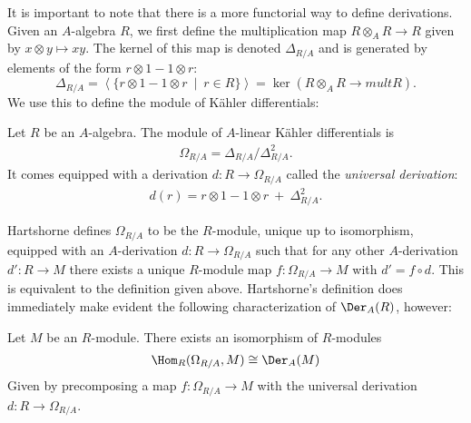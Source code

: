 It is important to note that there is a more functorial way to define derivations. Given an $A$-algebra $R$, we first define the multiplication map $R\otimes_A R\to R$ given by $x\otimes y\mapsto xy$. The kernel of this map is denoted $\Delta_{R/A}$ and is generated by elements of the form $r\otimes 1 - 1\otimes r$:
\begin{equation}\label{eqn:delta-module}
	\Delta_{R/A} = \left\langle \{r\otimes 1 - 1\otimes r ~\mid~ r\in R\} \right\rangle = \ker(R\otimes_A R \to{mult} R).
\end{equation}
We use this to define the module of K\"ahler differentials:
\begin{defn}\label{defn:kahler-diff}
	Let $R$ be an $A$-algebra. The module of $A$-linear K\"ahler differentials is
	\begin{align*}
		\Omega_{R/A} = \Delta_{R/A}/\Delta_{R/A}^2.
	\end{align*}
	It comes equipped with a derivation $d:R\to \Omega_{R/A}$ called the \emph{universal derivation}:
	\begin{align*}
		d(r) = r \otimes 1 - 1\otimes r ~+~ \Delta_{R/A}^2.
	\end{align*}
\end{defn}
Hartshorne defines $\Omega_{R/A}$ to be the $R$-module, unique up to isomorphism, equipped with an $A$-derivation $d:R\to \Omega_{R/A}$ such that for any other $A$-derivation $d':R\to M$ there exists a unique $R$-module map $f:\Omega_{R/A} \to M$ with $d' = f\circ d$. This is equivalent to the definition given above. Hartshorne's definition does immediately make evident the following characterization of $\Der_A(R)$, however:
\begin{prop}\label{prop:derivation-characterization}
	Let $M$ be an $R$-module. There exists an isomorphism of $R$-modules
	\begin{align*}
		\Hom_R(\Omega_{R/A},M) \cong \Der_A(M)
	\end{align*}
	Given by precomposing a map $f:\Omega_{R/A}\to M$ with the universal derivation $d:R\to \Omega_{R/A}$.
\end{prop}
